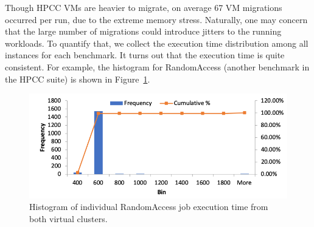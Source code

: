 Though HPCC VMs are heavier to migrate, on average 67 VM migrations occurred per run, due to the extreme memory stress. Naturally, one may concern that the large number of migrations could introduce jitters to the running workloads. To quantify that, we collect the execution time distribution among all instances for each benchmark. It turns out that the execution time is quite consistent. For example, the histogram for RandomAccess (another benchmark in the HPCC suite) is shown in Figure~\ref{fig:ra_histogram}.

\begin{figure}[!t]
   \begin{center}
       \includegraphics[width=\columnwidth]{Figures/ra_histogram}
   \end{center}
   \caption{Histogram of individual RandomAccess job execution time from both virtual clusters.}
   \label{fig:ra_histogram}
 \end{figure}




